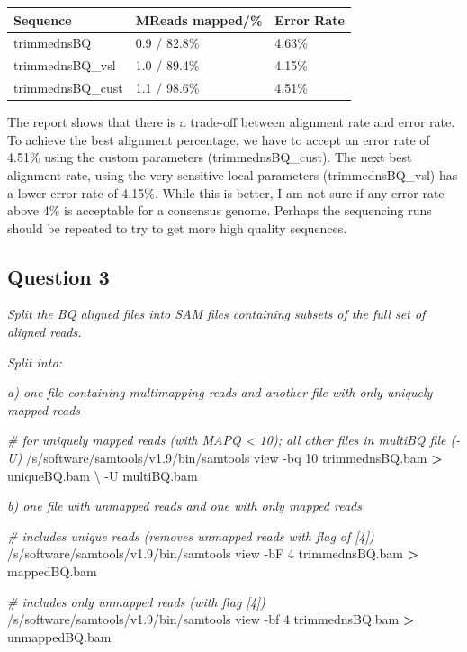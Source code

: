\documentclass[12pt,]{article}
\newenvironment{Shaded}{\begin{snugshade}}{\end{snugshade}}
\newcommand{\CommentTok}[1]{\textcolor[rgb]{0.56,0.35,0.01}{\textit{#1}}}
\newcommand{\OperatorTok}[1]{\textcolor[rgb]{0.81,0.36,0.00}{\textbf{#1}}}
\newcommand{\ExtensionTok}[1]{#1}
\newcommand{\NormalTok}[1]{#1}
\begin{document}
\begin{longtable}[]{@{}lll@{}}
\toprule
Sequence & MReads mapped/\% & Error Rate\tabularnewline
\midrule
\endhead
trimmednsBQ & 0.9 / 82.8\% & 4.63\%\tabularnewline
trimmednsBQ\_vsl & 1.0 / 89.4\% & 4.15\%\tabularnewline
trimmednsBQ\_cust & 1.1 / 98.6\% & 4.51\%\tabularnewline
\bottomrule
\end{longtable}

The report shows that there is a trade-off between alignment rate and
error rate. To achieve the best alignment percentage, we have to accept
an error rate of 4.51\% using the custom parameters (trimmednsBQ\_cust).
The next best alignment rate, using the very sensitive local parameters
(trimmednsBQ\_vsl) has a lower error rate of 4.15\%. While this is
better, I am not sure if any error rate above 4\% is acceptable for a
consensus genome. Perhaps the sequencing runs should be repeated to try
to get more high quality sequences.

\subsection{Question 3}\label{question-3}

\emph{Split the BQ aligned files into SAM files containing subsets of
the full set of aligned reads.}

\emph{Split into:}

\emph{a) one file containing multimapping reads and another file with
only uniquely mapped reads}

\begin{Shaded}
\begin{Highlighting}[]
\CommentTok{# for uniquely mapped reads (with MAPQ < 10); all other files in multiBQ file (-U)}
\ExtensionTok{/s/software/samtools/v1.9/bin/samtools}\NormalTok{ view -bq 10 trimmednsBQ.bam }\OperatorTok{>}\NormalTok{ uniqueBQ.bam \textbackslash{}}
\NormalTok{-U multiBQ.bam}
\end{Highlighting}
\end{Shaded}

\emph{b) one file with unmapped reads and one with only mapped reads}

\begin{Shaded}
\begin{Highlighting}[]
\CommentTok{# includes unique reads (removes unmapped reads with flag of [4])}
\ExtensionTok{/s/software/samtools/v1.9/bin/samtools}\NormalTok{ view -bF 4 trimmednsBQ.bam }\OperatorTok{>}\NormalTok{ mappedBQ.bam}

\CommentTok{# includes only unmapped reads (with flag [4])}
\ExtensionTok{/s/software/samtools/v1.9/bin/samtools}\NormalTok{ view -bf 4 trimmednsBQ.bam }\OperatorTok{>}\NormalTok{ unmappedBQ.bam}
\end{Highlighting}
\end{Shaded}
\end{document}
